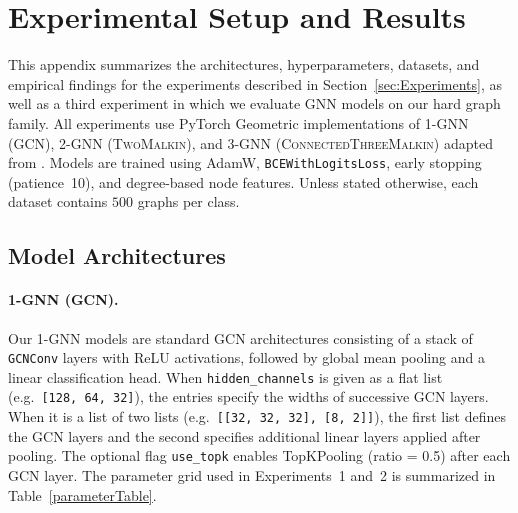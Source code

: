\section{Experimental Setup and Results}\label{app:Experiments}

This appendix summarizes the architectures, hyperparameters, datasets, and empirical findings for the experiments described in Section~\ref{sec:Experiments}, as well as a third experiment in which we evaluate GNN models on our hard graph family. All experiments use PyTorch Geometric implementations of 1-GNN (GCN), 2-GNN (\textsc{TwoMalkin}), and 3-GNN (\textsc{ConnectedThreeMalkin}) adapted from \citet{MorrisEtAl2019}. Models are trained using AdamW, \texttt{BCEWithLogitsLoss}, early stopping (patience~10), and degree-based node features. Unless stated otherwise, each dataset contains $500$ graphs per class.


\subsection{Model Architectures}

\paragraph{1-GNN (GCN).}
Our 1-GNN models are standard GCN architectures consisting of a stack of \texttt{GCNConv} layers with ReLU activations, followed by global mean pooling and a linear classification head. When \texttt{hidden\_channels} is given as a flat list (e.g.\ \texttt{[128, 64, 32]}), the entries specify the widths of successive GCN layers. When it is a list of two lists (e.g.\ \texttt{[[32, 32, 32], [8, 2]]}), the first list defines the GCN layers and the second specifies additional linear layers applied after pooling. The optional flag \texttt{use\_topk} enables TopKPooling (ratio = 0.5) after each GCN layer. The parameter grid used in Experiments~1 and~2 is summarized in Table~\ref{parameterTable}.

